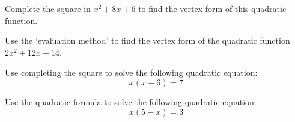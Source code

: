 \documentclass[11pt,letterpaper]{article}
\begin{document}

 Complete the square in $x^2 + 8x + 6$ to find the vertex form of this quadratic function. 



\newpage



 Use the `evaluation method' to find the vertex form of the quadratic function $2x^2 + 12x - 14$. 



\newpage



 Use completing the square to solve the following quadratic equation: 
	\[
	x(x - 6)= 7
	\]



\newpage



 Use the quadratic formula to solve the following quadratic equation:
	\[
	x(5 - x)= 3
	\]
\end{document}
